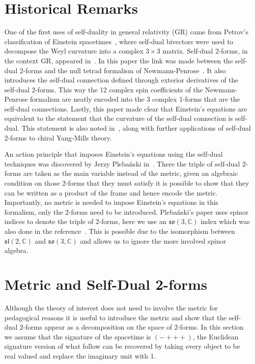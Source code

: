 \documentclass[10pt]{report}
\newcommand{\pleb}[0]{Pleba\'nski}
\theoremstyle{definition}
\newcommand{\C}[0]{\mathbb{C}}
\begin{document}
\section{Historical Remarks}

One of the first uses of self-duality in general relativity (GR) came from Petrov's classification of Einstein spacetimes~\cite{The_Classificat_Petrov_2000}, where self-dual bivectors were used to decompose the Weyl curvature into a complex $3 \times 3$ matrix. Self-dual 2-forms, in the context GR, appeared in~\cite{01138a60-03bf-3425-9736-5043c4a7c399}. In this paper the link was made between the self-dual 2-forms and the null tetrad formalism of Newmann-Penrose~\cite{A_spinor_approa_Penros_1960,An_Approach_to_Newman_1962}. It also introduces the self-dual connection defined through exterior derivatives of the self-dual 2-forms. This way the 12 complex spin coefficients of the Newmann-Penrose formalism are neatly encoded into the 3 complex 1-forms that are the self-dual connections. Lastly, this paper made clear that Einstein's equations are equivalent to the statement that the curvature of the self-dual connection is self-dual. This statement is also noted in~\cite{AtiyahHitchinSingerSelfDual1978}, along with further applications of self-dual 2-forms to chiral Yang-Mills theory.

An action principle that imposes Einstein's equations using the self-dual techniques was discovered by Jerzy \pleb{} in~\cite{OnTheSeparatiPleban1977}. There the triple of self-dual 2-forms are taken as the main variable instead of the metric, given an algebraic condition on those 2-forms that they must satisfy it is possible to show that they can be written as a product of the frame and hence encode the metric. Importantly, no metric is needed to impose Einstein's equations in this formalism, only the 2-forms need to be introduced. \pleb{}'s paper uses spinor indices to denote the triple of 2-forms, here we use an $\mathfrak{so}(3,\C)$ index which was also done in the reference~\cite{Complex_structu_Brans_1974}. This is possible due to the isomorphism between $\mathfrak{sl}(2,\C)$ and $\mathfrak{so}(3,\C)$ and allows us to ignore the more involved spinor algebra.

\section{Metric and Self-Dual 2-forms}
Although the theory of interest does not need to involve the metric for pedagogical reasons it is useful to introduce the metric and show that the self-dual 2-forms appear as a decomposition on the space of 2-forms. In this section we assume that the signature of the spacetime is $(-+++)$, the Euclidean signature version of what follow can be recovered by taking every object to be real valued and replace the imaginary unit with 1.
\end{document}
